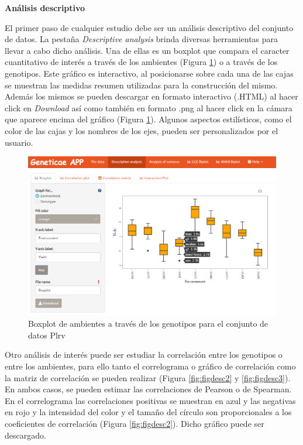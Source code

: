 \textbf{Análisis descriptivo}

El primer paso de cualquier estudio debe ser un análisis descriptivo del conjunto de datos. La pestaña \emph{Descriptive analysis} brinda diversas herramientas para llevar a cabo dicho análisis. Una de ellas es un boxplot que compara el caracter cuantitativo de interés a través de los ambientes (Figura \ref{fig:figdesc1}) o a través de los genotipos. Este gráfico es interactivo, al posicionarse sobre cada una de las cajas se muestran las medidas resumen utilizadas para la construcción del mismo. Además los mismos se pueden descargar en formato interactivo (.HTML) al hacer click en \emph{Download} así como también en formato .png al hacer click en la cámara que aparece encima del gráfico (Figura \ref{fig:figdesc1}). Algunos aspectos estilísticos, como el color de las cajas y los nombres de los ejes, pueden ser personalizados por el usuario. 

\begin{figure}[H]
	\begin{center}
		\includegraphics[width=16cm]{./Graficos/Boxplot_environment.png}
	\end{center}
	\caption{Boxplot de ambientes a través de los genotipos para el conjunto de datos Plrv}
	\label{fig:figdesc1}
\end{figure}

Otro análisis de interés puede ser estudiar la correlación entre los genotipos o entre los ambientes, para ello tanto el correlograma o gráfico de correlación como la matriz de correlación se pueden realizar (Figura \ref{fig:figdesc2} y \ref{fig:figdesc3}). En ambos casos, se pueden estimar las correlaciones de Pearson o de Spearman. En el correlograma las correlaciones positivas se muestran en azul y las negativas en rojo y la intensidad del color y el tamaño del círculo son proporcionales a los coeficientes de correlación (Figura \ref{fig:figdesc2}). Dicho gráfico puede ser descargado.


